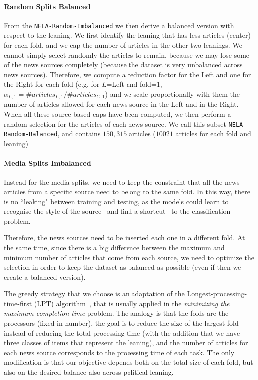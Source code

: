 \paragraph{Random Splits Balanced}

From the \texttt{NELA-Random-Imbalanced} we then derive a balanced version with respect to the leaning. We first identify the leaning that has less articles (center) for each fold, and we cap the number of articles in the other two leanings.
We cannot simply select randomly the articles to remain, because we may lose some of the news sources completely (because the dataset is very unbalanced across news sources).
Therefore, we compute a reduction factor for the Left and one for the Right for each fold (e.g. for $L$=Left and fold=1, $\alpha_{L,1} = \#articles_{L,1} / \#articles_{C,1}$) and we scale proportionally with them the number of articles allowed for each news source in the Left and in the Right. When all these source-based caps have been computed, we then perform a random selection for the articles of each news source.  
We call this subset \texttt{NELA-Random-Balanced}, and contains $150,315$ articles ($10021$ articles for each fold and leaning)

\paragraph{Media Splits Imbalanced}

Instead for the media splits, we need to keep the constraint that all the news articles from a specific source need to belong to the same fold. In this way, there is no ``leaking" between training and testing, as the models could learn to recognise the style of the source~\citep{baly2020we} and find a shortcut~\citep{geirhos2020shortcut} to the classification problem.

Therefore, the news sources need to be inserted each one in a different fold. At the same time, since there is a big difference between the maximum and minimum number of articles that come from each source, we need to optimize the selection in order to keep the dataset as balanced as possible (even if then we create a balanced version).

The greedy strategy that we choose is an adaptation of the Longest-processing-time-first (LPT) algorithm~\citep{graham1969bounds}, that is usually applied in the \emph{minimizing the maximum completion time} problem.
The analogy is that the folds are the processors (fixed in number), the goal is to reduce the size of the largest fold instead of reducing the total processing time (with the addition that we have three classes of items that represent the leaning), and the number of articles for each news source corresponds to the processing time of each task.
The only modification is that our objective depends both on the total size of each fold, but also on the desired balance also across political leaning.

